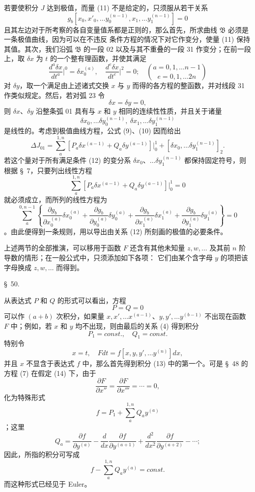 \documentclass[11pt,a4paper,leqno]{article}
\begin{document}
若要使积分 $J$ 达到极值，而量 (11) 不是给定的，只须服从若干关系
\begin{equation}\tag{12}
g_b[x_0,x'_0,\ldots y_0^{(n-1)},x_1,\ldots y_1^{(n-1)}]=0
\end{equation}
且其左边对于所考察的各自变量值系都是正则的，那么首先，所求曲线 $\mathfrak B$ 必须是一条极值曲线，因为可以在不违反
条件方程的情况下对它作变分，使量 (11) 保持其值。其次，我们沿弧 $\mathfrak B$ 的一段 02 以及与其不重叠的一段 31 作变分；在前一段上，取 $\delta x$ 为 $t$ 的一个整有理函数，并使其满足
\[
\frac{d^a\delta x}{dt^a}\bigg|^0=\delta x_0^{(a)},\quad
\frac{d^e\delta x}{dt^e}\bigg|^2=0;\quad
\binom{a=0,1,\ldots n-1}{e=0,1,\ldots 2n}
\]
对 $\delta y$，取一个满足由上述诸式交换 $x$ 与 $y$ 而得的各方程的整函数，并对线段 31 作类似规定。然后，若对弧 23 令
\[
\delta x=\delta y=0,
\]
则 $\delta x$、$\delta y$ 沿整条弧 01 具有与 $x$ 和 $y$ 相同的连续性性质，并且关于诸量
\[
\delta x_0,\ldots \delta y_0^{(n-1)},\ \delta x_1,\ldots \delta y_1^{(n-1)}
\]
是线性的。考虑到极值曲线方程，公式 (9)、(10) 因而给出
\[
\Delta J_{01}=\sum_a^{1,n}[P_a\delta x^{(a-1)}+Q_a\delta y^{(a-1)}]\bigg|_0^1
+[\delta x_0,\ldots \delta y_1^{(n-1)}]_2.
\]
若这个量对于所有满足条件 (12) 的变分系 $\delta x_0$、$\ldots\delta y_1^{(n-1)}$ 都保持固定符号，则根据 \S~7，只要列出线性方程
\[
\sum_a^{1,n}[P_a\delta x^{(a-1)}+Q_a\delta y^{(a-1)}]\bigg|_0^1=0
\]
就必须成立，而所列的线性方程为
\[
\sum_a^{0,n-1}\left\{\frac{\partial g_b}{\partial x_0^{(a)}}\delta x_0^{(a)}+\frac{\partial g_b}{\partial y_0^{(a)}}\delta y_0^{(a)}+\frac{\partial g_b}{\partial x_1^{(a)}}\delta x_1^{(a)}
+\frac{\partial g_b}{\partial y_1^{(a)}}\delta y_1^{(a)}\right\}=0
\]
。由此便得到一条规则，用以导出由关系 (12) 所刻画的极值的必要条件。

上述两节的全部推演，可以移用于函数 $F$ 还含有其他未知量 $z,w,\ldots$ 及其前 $n$ 阶导数的情形；在一般公式中，只须添加如下各项：
它们由某个含字母 $y$ 的项把该字母换成 $z,w,\ldots$ 而得到。

\begin{center}
{\large \S~50.}
\end{center}

从表达式 $P$ 和 $Q$ 的形式可以看出，方程
\[
P=Q=0
\]
可以作 $(a+b)$ 次积分，如果量 $x,x',\ldots x^{(a-1)}$、$y,y',\ldots y^{(b-1)}$ 不出现在函数 $F$ 中；例如，若 $x$ 和 $y$ 均不出现，则由最后的关系 (4) 得到积分
\begin{equation}\tag{13}
P_1=const.,\quad Q_1=const.
\end{equation}
特别令
\begin{equation}\tag{14}
x=t,\quad Fdt=f[x,y,y',\ldots y^{(n)}]dx,
\end{equation}
并且 $x$ 不显含于表达式 $f$ 中，那么首先得到积分 (13) 中的第一个。可是 \S~48 的方程 (7) 在假定 (14) 下，由于
\[
\frac{\partial F}{\partial x''}=\frac{\partial F}{\partial x'''}=\cdots=0,
\]
化为特殊形式
\[
f=P_1+\sum_a^{1,n}Q_ay^{(a)}
\]
；这里
\[
Q_a=\frac{\partial f}{\partial y^{(a)}}-\frac{d}{dx}\frac{\partial f}{\partial y^{(a+1)}}+\frac{d^2}{dx^2}\frac{\partial f}{\partial y^{(a+2)}}-\cdots;
\]
因此，所指的积分可写成
\begin{equation}\tag{15}
f-\sum_a^{1,n}Q_ay^{(a)}=const.
\end{equation}
而这种形式已经见于 Euler。
\end{document}
